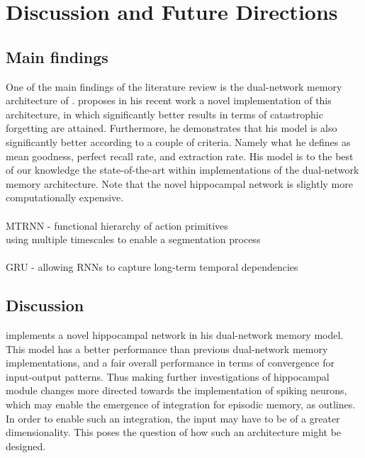 
\chapter{Discussion and Future Directions}
\section{Main findings}

One of the main findings of the literature review is the dual-network memory architecture of \cite{McClelland1995}. \cite{Hattori2014} proposes in his recent work a novel implementation of this architecture, in which significantly better results in terms of catastrophic forgetting are attained. Furthermore, he demonstrates that his model is also significantly better according to a couple of criteria. Namely what he defines as mean goodness, perfect recall rate, and extraction rate. His model is to the best of our knowledge the state-of-the-art within implementations of the dual-network memory architecture. 
Note that the novel hippocampal network is slightly more computationally expensive.
\\\\
MTRNN - functional hierarchy of action primitives
\\
using multiple timescales to enable a segmentation process
\\\\
GRU - allowing RNNs to capture long-term temporal dependencies


\section{Discussion}

\cite{Hattori2014} implements a novel hippocampal network in his dual-network memory model. This model has a better performance than previous dual-network memory implementations, and a fair overall performance in terms of convergence for input-output patterns. Thus making further investigations of hippocampal module changes more directed towards the implementation of spiking neurons, which may enable the emergence of integration for episodic memory, as \cite{Hattori2014} outlines. In order to enable such an integration, the input may have to be of a greater dimensionality. This poses the question of how such an architecture might be designed.

